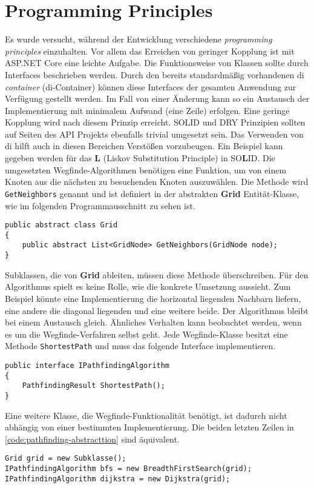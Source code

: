 \part{Programming Principles}
Es wurde versucht, während der Entwicklung
verschiedene \textit{programming principles} einzuhalten.
Vor allem das Erreichen von geringer Kopplung ist mit
ASP.NET Core eine leichte Aufgabe.
Die Funktionsweise von Klassen sollte durch Interfaces beschrieben werden.
Durch den bereits standardmäßig vorhandenen \acl{di} \textit{container} (\acs{di}-Container)
können diese Interfaces der gesamten Anwendung zur Verfügung gestellt werden.
Im Fall von einer Änderung kann so ein Austausch der
Implementierung mit minimalem Aufwand (eine Zeile) erfolgen.
Eine geringe Kopplung wird nach diesem Prinzip erreicht.
SOLID und DRY Prinzipien sollten auf Seiten des API Projekts ebenfalls trivial umgesetzt sein.
Das Verwenden von \acs{di} hilft auch in diesen Bereichen Verstößen vorzubeugen.
Ein Beispiel kann gegeben werden für das \textbf{L} (Liskov Substitution Principle)
in SO\textbf{L}ID. Die umgesetzten Wegfinde-Algorithmen benötigen eine
Funktion, um von einem Knoten aus die nächsten zu besuchenden
Knoten auszuwählen. Die Methode wird \texttt{GetNeighbors}
genannt und ist definiert in der abstrakten \textbf{Grid} Entität-Klasse,
wie im folgenden Programmausschnitt zu sehen ist.

\begin{lstlisting}[caption={Die \textbf{Grid} Entität-Klasse},label={code:grid-entity}]
public abstract class Grid
{
    public abstract List<GridNode> GetNeighbors(GridNode node);
}
\end{lstlisting}
Subklassen, die von \textbf{Grid} ableiten, müssen diese Methode überschreiben.
Für den Algorithmus spielt es keine Rolle, wie die konkrete Umsetzung aussieht.
Zum Beispiel könnte eine Implementierung die horizontal liegenden Nachbarn liefern,
eine andere die diagonal liegenden und eine weitere beide. Der Algorithmus bleibt
bei einem Austausch gleich. Ähnliches Verhalten kann
beobachtet werden, wenn es um die Wegfinde-Verfahren selbst geht.
Jede Wegfinde-Klasse besitzt eine Methode \texttt{ShortestPath}
und muss das folgende Interface implementieren.
\begin{lstlisting}[caption={Wegfinde-Algorithmus Interface},label={code:i-pathfinding}]
public interface IPathfindingAlgorithm
{
    PathfindingResult ShortestPath();
}
\end{lstlisting}
Eine weitere Klasse, die Wegfinde-Funktionalität benötigt, ist dadurch nicht abhängig
von einer bestimmten Implementierung. Die beiden letzten Zeilen
in \autoref{code:pathfinding-abstracttion} sind äquivalent.
\newpage
\begin{lstlisting}[caption={Abstraktion der Wegfinde-Algorithmen},
label={code:pathfinding-abstracttion}]
Grid grid = new Subklasse();
IPathfindingAlgorithm bfs = new BreadthFirstSearch(grid);
IPathfindingAlgorithm dijkstra = new Dijkstra(grid);
\end{lstlisting}